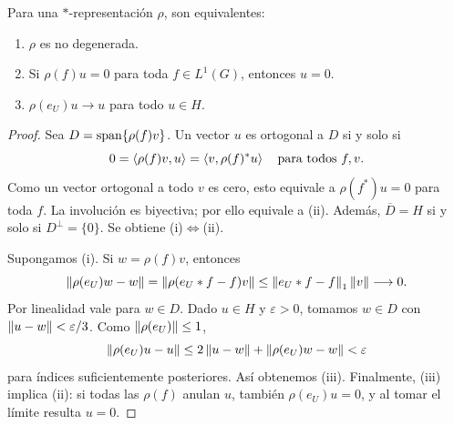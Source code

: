 \begin{proposicion}\label{v4-l24-p:nd}
Para una $*$-representación $\rho$, son equivalentes:
\begin{enumerate}
\item $\rho$ es no degenerada.
\item Si $\rho(f)u=0$ para toda $f\in L^1(G)$, entonces $u=0$.
\item $\rho(e_U)u\to u$ para todo $u\in H$.
\end{enumerate}
\end{proposicion}
\begin{proof}
Sea $D=\operatorname{span}\{\rho(f)v\}$. Un vector $u$ es ortogonal a $D$ si y solo si
\[
0=\left\langle\rho(f)v,u\right\rangle=\left\langle v,\rho(f)^*u\right\rangle
\quad\text{para todos }f,v.
\]
Como un vector ortogonal a todo $v$ es cero, esto equivale a $\rho(f^*)u=0$ para toda $f$. La involución es biyectiva; por ello equivale a (ii). Además, $\overline D=H$ si y solo si $D^\perp=\{0\}$. Se obtiene (i)$\Leftrightarrow$(ii).

Supongamos (i). Si $w=\rho(f)v$, entonces
\[
\left\lVert\rho(e_U)w-w\right\rVert
=\left\lVert\rho(e_U*f-f)v\right\rVert\leq\left\lVert e_U*f-f\right\rVert_1\left\lVert v\right\rVert\longrightarrow0.
\]
Por linealidad vale para $w\in D$. Dado $u\in H$ y $\varepsilon>0$, tomamos $w\in D$ con $\left\lVert u-w\right\rVert<\varepsilon/3$. Como $\left\lVert\rho(e_U)\right\rVert\leq1$,
\[
\left\lVert\rho(e_U)u-u\right\rVert\leq2\left\lVert u-w\right\rVert+\left\lVert\rho(e_U)w-w\right\rVert<\varepsilon
\]
para índices suficientemente posteriores. Así obtenemos (iii). Finalmente, (iii) implica (ii): si todas las $\rho(f)$ anulan $u$, también $\rho(e_U)u=0$, y al tomar el límite resulta $u=0$.
\end{proof}

